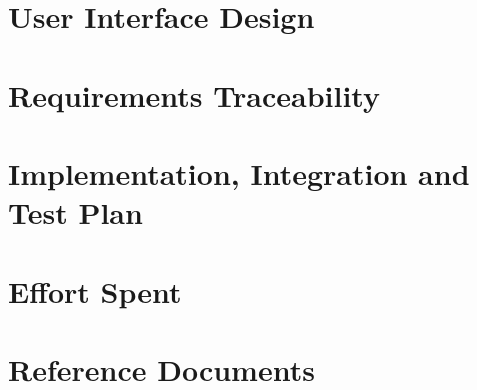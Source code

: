 \documentclass{article}
\begin{document}
\section{User Interface Design}

\section{Requirements Traceability}

\section{Implementation, Integration and Test Plan}

\section{Effort Spent}

\section{Reference Documents}
\end{document}
